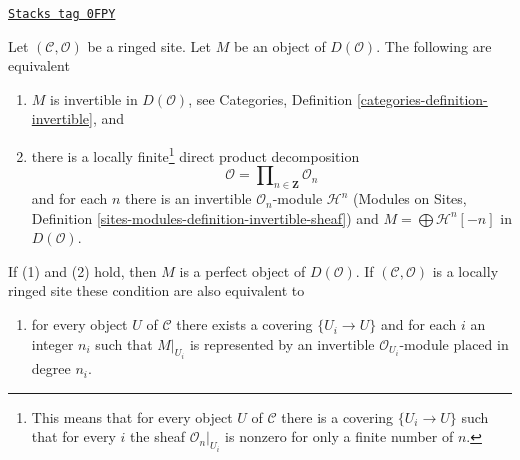 \begin{lemma}
\label{sites-cohomology-lemma-invertible-derived}
\href{https://stacks.math.columbia.edu/tag/0FPY}{\texttt{Stacks tag 0FPY}}

Let $(\mathcal{C}, \mathcal{O})$ be a ringed site. Let $M$ be an object
of $D(\mathcal{O})$. The following are equivalent
\begin{enumerate}
\item $M$ is invertible in $D(\mathcal{O})$, see
Categories, Definition \ref{categories-definition-invertible}, and
\item there is a locally finite\footnote{This means that for every
object $U$ of $\mathcal{C}$ there is a covering $\{U_i \to U\}$
such that for every $i$ the sheaf $\mathcal{O}_n|_{U_i}$ is nonzero
for only a finite number of $n$.} direct product decomposition
$$
\mathcal{O} = \prod\nolimits_{n \in \mathbf{Z}} \mathcal{O}_n
$$
and for each $n$ there is an invertible $\mathcal{O}_n$-module
$\mathcal{H}^n$
(Modules on Sites, Definition \ref{sites-modules-definition-invertible-sheaf})
and $M = \bigoplus \mathcal{H}^n[-n]$ in $D(\mathcal{O})$.
\end{enumerate}
If (1) and (2) hold, then $M$ is a perfect object of $D(\mathcal{O})$. If
$(\mathcal{C}, \mathcal{O})$ is a locally ringed site these condition
are also equivalent to
\begin{enumerate}
\item[(3)] for every object $U$ of $\mathcal{C}$ there exists a
covering $\{U_i \to U\}$ and for each $i$ an integer $n_i$ such that
$M|_{U_i}$ is represented by an invertible $\mathcal{O}_{U_i}$-module
placed in degree $n_i$.
\end{enumerate}
\end{lemma}

